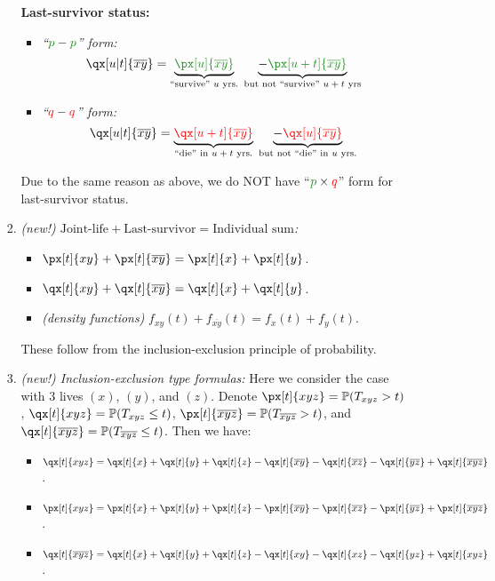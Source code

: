 \begin{enumerate}
\begin{enumerate}[label={(\arabic*)}]
\begin{enumerate}[label={(\roman*)}]
\textbf{Last-survivor status:}
\begin{itemize}
\item \emph{``\(\gc{p}-\gc{p}\)'' form:}
\[
\qx[u|t]{\overline{xy}}=\underbrace{\gc{\px[u]{\overline{xy}}}}_{\text{``survive'' \(u\) yrs.}}
\;\underbrace{-\gc{\px[u+t]{\overline{xy}}}}_{\text{but not ``survive'' \(u+t\) yrs}}
\]
\item \emph{``\({\color{red}q}-{\color{red}q}\)'' form:}
\[
\qx[u|t]{\overline{xy}}=\underbrace{\rc{\qx[u+t]{\overline{xy}}}}_{\text{``die'' in \(u+t\) yrs.}}\;
\underbrace{-\rc{\qx[u]{\overline{xy}}}}_{\text{but not ``die'' in \(u\) yrs.}}
\]
\end{itemize}
\begin{warning}
Due to the same reason as above, we do NOT have ``\(\gc{p}\times \rc{q}\)''
form for last-survivor status.
\end{warning}
\item \emph{(new!) \(\text{Joint-life}+\text{Last-survivor}=\text{Individual sum}\):}
\begin{itemize}
\item \(\px[t]{xy}+\px[t]{\overline{xy}}=\px[t]{x}+\px[t]{y}\).
\item \(\qx[t]{xy}+\qx[t]{\overline{xy}}=\qx[t]{x}+\qx[t]{y}\).
\item \emph{(density functions)} \(f_{xy}(t)+f_{\overline{xy}}(t)=f_{x}(t)+f_{y}(t)\).
\end{itemize}
\begin{note}
These follow from the inclusion-exclusion principle of probability.
\end{note}
\item \emph{(new!) Inclusion-exclusion type formulas:} Here we consider the
case with 3 lives \((x)\), \((y)\), and \((z)\). Denote
\(\px[t]{xyz}=\prob{T_{xyz}>t}\), \(\qx[t]{xyz}=\prob{T_{xyz}\le t}\),
\(\px[t]{\overline{xyz}}=\prob{T_{\overline{xyz}}>t}\), and
\(\qx[t]{\overline{xyz}}=\prob{T_{\overline{xyz}}\le t}\). Then we have:
\begin{itemize}
\item \(\qx[t]{xyz}=\qx[t]{x}+\qx[t]{y}+\qx[t]{z}-\qx[t]{\overline{xy}}-\qx[t]{\overline{xz}}
-\qx[t]{\overline{yz}}+\qx[t]{\overline{xyz}}\).

\item \(\px[t]{xyz}=\px[t]{x}+\px[t]{y}+\px[t]{z}-\px[t]{\overline{xy}}-\px[t]{\overline{xz}}
-\px[t]{\overline{yz}}+\px[t]{\overline{xyz}}\).

\item \(\qx[t]{\overline{xyz}}=\qx[t]{x}+\qx[t]{y}+\qx[t]{z}-\qx[t]{xy}-\qx[t]{xz}
-\qx[t]{yz}+\qx[t]{xyz}\).


\end{itemize}
\end{enumerate}
\end{enumerate}
\end{enumerate}
